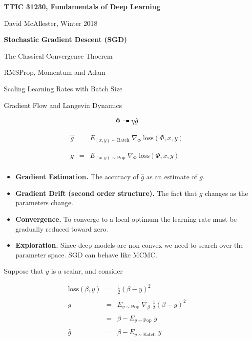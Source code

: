 


\newcommand{\solution}[1]{\bigskip {\bf Solution}: #1}



{\Huge
  \centerline{\bf TTIC 31230, Fundamentals of Deep Learning}
  \bigskip
  \centerline{David McAllester, Winter 2018}
  \vfill
  \centerline{\bf Stochastic Gradient Descent (SGD)}
  \vfill
  \centerline{The Classical Convergence Thoerem}
  \vfill
  \centerline{RMSProp, Momentum and Adam}
  \vfill
  \centerline{Scaling Learning Rates with Batch Size}
  \vfill
  \centerline{Gradient Flow and Langevin Dynamics}
  

$$\Phi \;\mbox{\tt -=}\; \eta \hat{g}$$

\vfill
\begin{eqnarray*}
  \hat{g} & = & E_{(x,y) \sim \mathrm{Batch}}\;\nabla_\Phi\;\mathrm{loss}(\Phi,x,y) \\
  \\
  \\
  g & = & E_{(x,y) \sim \mathrm{Pop}}\;\nabla_\Phi\;\mathrm{loss}(\Phi,x,y) \\
\end{eqnarray*}


\vfill
\begin{itemize}
\item {\bf Gradient Estimation.} The accuracy of $\hat{g}$ as an estimate of $g$.

  \vfill
\item {\bf Gradient Drift (second order structure).} The fact that $g$ changes as the parameters change.

  \vfill
\item {\bf Convergence.} To converge to a local optimum the learning rate must be gradually reduced toward zero.

  \vfill
  \item {\bf Exploration.} Since deep models are non-convex we need to search over the parameter space.  SGD can behave like MCMC.
\end{itemize}


Suppose that $y$ is a scalar, and consider

\begin{eqnarray*}
 \mathrm{loss}(\beta,y) & = & \frac{1}{2}(\beta - y)^2 \\
 \\
  g & = & E_{y \sim \mathrm{Pop}}\; \nabla_\beta\;\frac{1}{2}(\beta - y)^2 \\
  \\
  & = & \beta - E_{y \sim \mathrm{Pop}} \; y \\
  \\
  \hat{g} & = &\beta - E_{y \sim \mathrm{Batch}} \;y
\end{eqnarray*}

}
